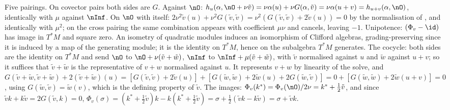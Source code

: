 Five pairings. On covector pairs both sides are $G$. Against $\nO$: $h_u(\alpha, \nO + \nu\tilde v) = \nu\alpha(u) + \nu G(\alpha, \tilde v) = \nu\alpha(u + v) = h_{u+v}(\alpha, \nO)$, identically with $\mu$ against $\nInf$. On $\nO$ with itself: $2\nu^2\tilde v(u) + \nu^2 G(\tilde v, \tilde v) = \nu^2(G(\tilde v, \tilde v) + 2\tilde v(u)) = 0$ by the normalisation of , and identically with $\mu^2$; on the cross pairing the same combination appears with coefficient $\mu\nu$ and cancels, leaving $-1$. Unipotence: $(\Phi_v - \id)$ has image in $T^*M$ and square zero. An isometry of quadratic modules induces an isomorphism of Clifford algebras, grading-preserving since it is induced by a map of the generating module; it is the identity on $T^*M$, hence on the subalgebra $T^*M$ generates. The cocycle: both sides are the identity on $T^*M$ and send $\nO$ to $\nO + \nu(\tilde v + \tilde w)$, $\nInf$ to $\nInf + \mu(\tilde v + \tilde w)$, with $\tilde v$ normalised against $u$ and $\tilde w$ against $u + v$; so it suffices that $\tilde v + \tilde w$ is the representative of $v + w$ normalised against $u$. It represents $v + w$ by linearity of the solve, and $G(\tilde v + \tilde w, \tilde v + \tilde w) + 2(\tilde v + \tilde w)(u) = [G(\tilde v, \tilde v) + 2\tilde v(u)] + [G(\tilde w, \tilde w) + 2\tilde w(u) + 2G(\tilde w, \tilde v)] = 0 + [G(\tilde w, \tilde w) + 2\tilde w(u + v)] = 0$, using $G(\tilde w, \tilde v) = \tilde w(v)$, which is the defining property of $\tilde v$. The images: $\Phi_v(k^*) = \Phi_v(\nO)/2\nu = k^* + \tfrac12\tilde v$, and since $\tilde v k + k\tilde v = 2G(\tilde v, k) = 0$, $\Phi_v(\sigma) = (k^* + \tfrac12\tilde v)k - k(k^* + \tfrac12\tilde v) = \sigma + \tfrac12(\tilde v k - k\tilde v) = \sigma + \tilde v k$.
